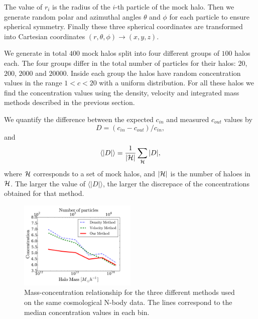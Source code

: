 \documentclass[a4,useAMS,usenatbib,usegraphicx]{mn2e}
\newcommand{\avg}[1]{\langle{#1}\rangle}
\begin{document}
The value of $r_i$ is the radius of the $i$-th particle of the mock
halo.  
Then we generate random polar and azimuthal angles $\theta$ and
$\phi$ for each particle to ensure spherical symmetry.  
Finally these three spherical coordinates are transformed into
Cartesian coordinates $(r,\theta,\phi) \rightarrow (x,y,z)$.

We generate in total $400$ mock halos split into four different groups
of $100$ halos each.  The four groups differ in the total number of
particles for their halos: $20$, $200$, $2000$ and $20000$.  
Inside each group the halos have random concentration values in the range
$1<c<20$ with a uniform distribution.  
For all these halos we find  the concentration values using the
density, velocity and integrated mass methods described in the
previous section.   


We quantify the difference between the expected $c_{in}$ and measured
$c_{out}$ values by 
%
\begin{equation}
D=(c_{in}-c_{out})/c_{in},
\label{eq:D}
\end{equation}
%
and
%
\begin{equation}
\avg{|D|}=\frac{1}{\left|{\cal{H}}\right|}\sum_{{\cal{H}}} |D|,
\end{equation}
%
where ${\cal{H}}$ corresponds to a set of mock halos, and
$\left|{\cal{H}}\right|$ is the number of haloes in ${\cal{H}}$. 
  The larger the value of $\avg{|D|}$, the larger the discrepace of
  the concentrations obtained for that method.


\begin{figure}
\begin{center}
  \includegraphics[width=0.50\textwidth]{concentration.pdf}
\end{center}
\caption{Mass-concentration relationship for the three different
  methods used on the same cosmological N-body data. 
  The lines correspond to the median concentration values in each bin.
  \label{fig:concentration}}
\end{figure}
\end{document}
